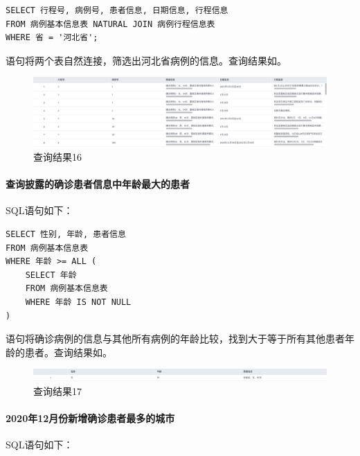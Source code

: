 \documentclass[lang=cn,11pt,a4paper,cite=authornum]{paper}
\begin{document}
\begin{code}
\begin{verbatim}
SELECT 行程号, 病例号, 患者信息, 日期信息, 行程信息
FROM 病例基本信息表 NATURAL JOIN 病例行程信息表 
WHERE 省 = '河北省';
\end{verbatim}
\end{code}

语句将两个表自然连接，筛选出河北省病例的信息。查询结果如。

\begin{figure}[!htb]
    \centering
    \includegraphics[width=\textwidth]{./images/lab1_query16.png}
    \caption{查询结果16\label{fig:query16}}
\end{figure}

\paragraph{查询披露的确诊患者信息中年龄最大的患者} SQL语句如下：

\begin{code}
\begin{verbatim}
SELECT 性别, 年龄, 患者信息
FROM 病例基本信息表
WHERE 年龄 >= ALL (
    SELECT 年龄
    FROM 病例基本信息表
    WHERE 年龄 IS NOT NULL 
)
\end{verbatim}
\end{code}

语句将确诊病例的信息与其他所有病例的年龄比较，找到大于等于所有其他患者年龄的患者。查询结果如。

\begin{figure}[!htb]
    \centering
    \includegraphics[width=\textwidth]{./images/lab1_query17.png}
    \caption{查询结果17\label{fig:query17}}
\end{figure}

\paragraph{2020年12月份新增确诊患者最多的城市} SQL语句如下：
\end{document}
